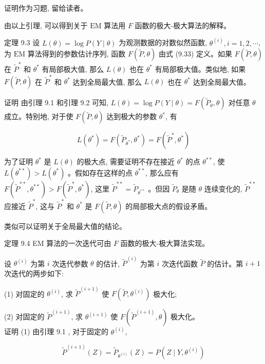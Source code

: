 \documentclass[10pt]{article}
\begin{document}
证明作为习题, 留给读者。

由以上引理, 可以得到关于 $\mathrm{EM}$ 算法用 $F$ 函数的极大-极大算法的解释。

定理 9.3 设 $L(\theta)=\log P(Y \mid \theta)$ 为观测数据的对数似然函数, $\theta^{(i)}, i=1,2, \cdots$, 为 $\mathrm{EM}$ 算法得到的参数估计序列, 函数 $F(\tilde{P}, \theta)$ 由式 (9.33) 定义。如果 $F(\tilde{P}, \theta)$ 在 $\tilde{P}^{*}$ 和 $\theta^{*}$ 有局部极大值, 那么 $L(\theta)$ 也在 $\theta^{*}$ 有局部极大值。类似地, 如果 $F(\tilde{P}, \theta)$ 在 $\tilde{P}^{*}$ 和 $\theta^{*}$ 达到全局最大值, 那么 $L(\theta)$ 也在 $\theta^{*}$ 达到全局最大值。

证明 由引理 9.1 和引理 9.2 可知, $L(\theta)=\log P(Y \mid \theta)=F\left(\tilde{P}_{\theta}, \theta\right)$ 对任意 $\theta$ 成立。特别地, 对于使 $F(\tilde{P}, \theta)$ 达到极大的参数 $\theta^{*}$, 有


\begin{equation*}
L\left(\theta^{*}\right)=F\left(\tilde{P}_{\theta^{*}}, \theta^{*}\right)=F\left(\tilde{P}^{*}, \theta^{*}\right) \tag{9.37}
\end{equation*}


为了证明 $\theta^{*}$ 是 $L(\theta)$ 的极大点, 需要证明不存在接近 $\theta^{*}$ 的点 $\theta^{* *}$, 使 $L\left(\theta^{* *}\right)>L\left(\theta^{*}\right)$ 。假如存在这样的点 $\theta^{* *}$, 那么应有 $F\left(\tilde{P}^{* *}, \theta^{* *}\right)>F\left(\tilde{P}^{*}, \theta^{*}\right)$, 这里 $\tilde{P}^{* *}=\tilde{P}_{\theta^{* *}}$ 。但因 $\tilde{P}_{\theta}$ 是随 $\theta$ 连续变化的, $\tilde{P}^{* *}$ 应接近 $\tilde{P}^{*}$, 这与 $\tilde{P}^{*}$ 和 $\theta^{*}$ 是 $F(\tilde{P}, \theta)$ 的局部极大点的假设矛盾。

类似可以证明关于全局最大值的结论。

定理 9.4 EM 算法的一次迭代可由 $F$ 函数的极大-极大算法实现。

设 $\theta^{(i)}$ 为第 $i$ 次迭代参数 $\theta$ 的估计, $\tilde{P}^{(i)}$ 为第 $i$ 次迭代函数 $\tilde{P}$ 的估计。第 $i+1$ 次迭代的两步如下:

(1) 对固定的 $\theta^{(i)}$, 求 $\tilde{P}^{(i+1)}$ 使 $F\left(\tilde{P}, \theta^{(i)}\right)$ 极大化;

(2) 对固定的 $\tilde{P}^{(i+1)}$, 求 $\theta^{(i+1)}$ 使 $F\left(\tilde{P}^{(i+1)}, \theta\right)$ 极大化。\\
证明 (1) 由引理 9.1 , 对于固定的 $\theta^{(i)}$,

$$
\tilde{P}^{(i+1)}(Z)=\tilde{P}_{\theta^{(i)}}(Z)=P\left(Z \mid Y, \theta^{(i)}\right)
$$
\end{document}
